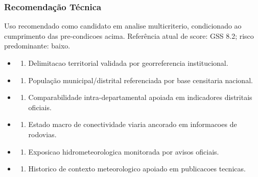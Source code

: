 {\subsubsection{Recomendação
Técnica}

Uso recomendado como candidato em analise multicriterio, condicionado ao
cumprimento das pre-condicoes acima. Referência atual de score: GSS 8.2;
risco predominante: baixo.

\begin{itemize}
\tightlist
\item
  \begin{enumerate}
  \def\labelenumi{\arabic{enumi})}
  \tightlist
  \item
    Delimitacao territorial validada por georreferencia institucional.
  \end{enumerate}
\item
  \begin{enumerate}
  \def\labelenumi{\arabic{enumi})}
  \setcounter{enumi}{1}
  \tightlist
  \item
    População municipal/\allowbreak distrital referenciada por base censitaria
    nacional.
  \end{enumerate}
\item
  \begin{enumerate}
  \def\labelenumi{\arabic{enumi})}
  \setcounter{enumi}{2}
  \tightlist
  \item
    Comparabilidade intra-departamental apoiada em indicadores
    distritais oficiais.
  \end{enumerate}
\item
  \begin{enumerate}
  \def\labelenumi{\arabic{enumi})}
  \setcounter{enumi}{3}
  \tightlist
  \item
    Estado macro de conectividade viaria ancorado em informacoes de
    rodovias.
  \end{enumerate}
\item
  \begin{enumerate}
  \def\labelenumi{\arabic{enumi})}
  \setcounter{enumi}{4}
  \tightlist
  \item
    Exposicao hidrometeorologica monitorada por avisos oficiais.
  \end{enumerate}
\item
  \begin{enumerate}
  \def\labelenumi{\arabic{enumi})}
  \setcounter{enumi}{5}
  \tightlist
  \item
    Historico de contexto meteorologico apoiado em publicacoes tecnicas.

\end{enumerate}
\end{itemize}}
